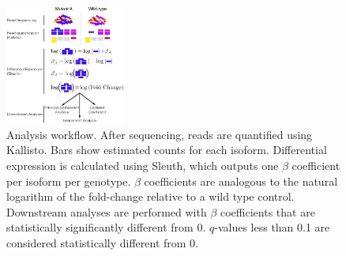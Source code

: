 \documentclass[9pt,twocolumn,twoside]{pnas-new}
\begin{document}
\begin{figure}[tbhp]
  \centering
  \includegraphics[width=0.35\textwidth]{../figs/meaningofbeta.pdf}
  \caption{
    Analysis workflow. After sequencing, reads are quantified using Kallisto.
    Bars show estimated counts for each isoform. Differential expression is
    calculated using Sleuth, which outputs one $\beta$ coefficient per isoform
    per genotype. $\beta$ coefficients are analogous to the natural logarithm of
    the fold-change relative to a wild type control. Downstream analyses are
    performed with $\beta$ coefficients that are statistically significantly
    different from 0. $q$-values less than 0.1 are considered statistically
    different from 0.
  }
\label{fig:explain}
\end{figure}
\end{document}
